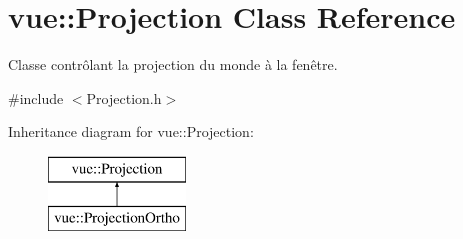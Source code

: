 \hypertarget{classvue_1_1_projection}{}\section{vue\+:\+:Projection Class Reference}
\label{classvue_1_1_projection}


Classe contrôlant la projection du monde à la fenêtre.  




{\ttfamily \#include $<$Projection.\+h$>$}

Inheritance diagram for vue\+:\+:Projection\+:\begin{figure}[H]
\begin{center}
\leavevmode
\includegraphics[height=2.000000cm]{classvue_1_1_projection}
\end{center}
\end{figure}

